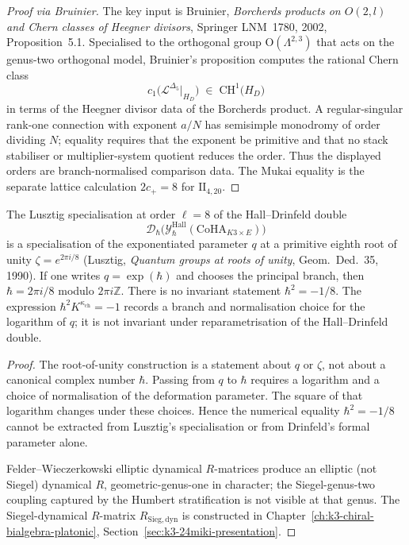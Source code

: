 \begin{proof}[Proof via Bruinier]
\label{proof:humbert-monodromy}
The key input is Bruinier, \emph{Borcherds products on $O(2,l)$ and Chern classes of Heegner divisors}, Springer LNM~1780, 2002, Proposition~5.1. Specialised to the orthogonal group $\mathrm{O}(\Lambda^{2,3})$ that acts on the genus-two orthogonal model, Bruinier's proposition computes the rational Chern class
\[
 c_1\bigl(\mathcal{L}^{\Delta_5}|_{H_D}\bigr)
 \;\in\;
 \mathrm{CH}^1\bigl(H_D\bigr)
\]
in terms of the Heegner divisor data of the Borcherds product. A regular-singular rank-one connection with exponent $a/N$ has semisimple monodromy of order dividing $N$; equality requires that the exponent be primitive and that no stack stabiliser or multiplier-system quotient reduces the order. Thus the displayed orders are branch-normalised comparison data. The Mukai equality is the separate lattice calculation $2c_+=8$ for $\mathrm{II}_{4,20}$.
\end{proof}

\begin{proposition}[Lusztig specialisation \texorpdfstring{$\ell=8$}{l=8} and the deformation parameter]
\label{prop:lusztig-l8-universal-identity}
The Lusztig specialisation at order $\ell=8$ of the Hall--Drinfeld double
\[
 \mathcal{D}_\hbar\bigl(\mathcal{Y}^{\mathrm{Hall}}_\hbar(\mathrm{CoHA}_{K3\times E})\bigr)
\]
is a specialisation of the exponentiated parameter $q$ at a primitive eighth root of unity $\zeta=e^{2\pi i/8}$ (Lusztig, \emph{Quantum groups at roots of unity}, Geom.~Ded.~35, 1990). If one writes $q=\exp(\hbar)$ and chooses the principal branch, then $\hbar=2\pi i/8$ modulo $2\pi i\mathbb{Z}$. There is no invariant statement $\hbar^2=-1/8$. The expression $\hbar^2 K^{\kappa_{\mathrm{ch}}}=-1$ records a branch and normalisation choice for the logarithm of \(q\); it is not invariant under reparametrisation of the Hall--Drinfeld double.
\end{proposition}

\begin{proof}[Proof]
The root-of-unity construction is a statement about $q$ or $\zeta$, not about a canonical complex number $\hbar$. Passing from $q$ to $\hbar$ requires a logarithm and a choice of normalisation of the deformation parameter. The square of that logarithm changes under these choices. Hence the numerical equality $\hbar^2=-1/8$ cannot be extracted from Lusztig's specialisation or from Drinfeld's formal parameter alone.

Felder--Wieczerkowski elliptic dynamical $R$-matrices produce an
elliptic (not Siegel) dynamical $R$, geometric-genus-one in character;
the Siegel-genus-two coupling captured by the Humbert stratification
is not visible at that genus. The Siegel-dynamical $R$-matrix
$R_{\mathrm{Sieg,dyn}}$ is constructed in
Chapter~\ref{ch:k3-chiral-bialgebra-platonic},
Section~\ref{sec:k3-24miki-presentation}.
\end{proof}

